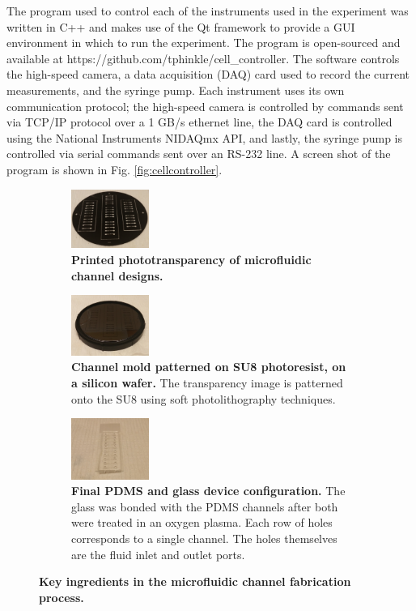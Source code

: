 		
		
		
		
		
		The program used to control each of the instruments used in the experiment was written in C++ and makes use of the Qt framework to provide a GUI environment in which to run the experiment. The program is open-sourced and available at https://github.com/tphinkle/cell\_controller. The software controls the high-speed camera, a data acquisition (DAQ) card used to record the current measurements, and the syringe pump. Each instrument uses its own communication protocol; the high-speed camera is controlled by commands sent via TCP/IP protocol over a 1 GB/s ethernet line, the DAQ card is controlled using the National Instruments NIDAQmx API, and lastly, the syringe pump is controlled via serial commands sent over an RS-232 line. A screen shot of the program is shown in Fig. \ref{fig:cellcontroller}.
		
		
		\begin{figure}[t!]
			\centering
			\begin{subfigure}[t]{0.3\textwidth}
				\centering
				\includegraphics[width=1in]{transparency}
				\caption{\textbf{Printed phototransparency of microfluidic channel designs.}}
			\end{subfigure}
			\begin{subfigure}[t]{0.3\textwidth}
				\centering
				\includegraphics[width=1in]{wafer}
				\caption{\textbf{Channel mold patterned on SU8 photoresist, on a silicon wafer.} The transparency image is patterned onto the SU8 using soft photolithography techniques.}
			\end{subfigure}
			\begin{subfigure}[t]{0.3\textwidth}
				\centering
				\includegraphics[width=1in]{chip}
				\caption{\textbf{Final PDMS and glass device configuration.} The glass was bonded with the PDMS channels after both were treated in an oxygen plasma. Each row of holes corresponds to a single channel. The holes themselves are the fluid inlet and outlet ports.}
			\end{subfigure}
			\caption{\textbf{Key ingredients in the microfluidic channel fabrication process.}}
		\end{figure}
		
